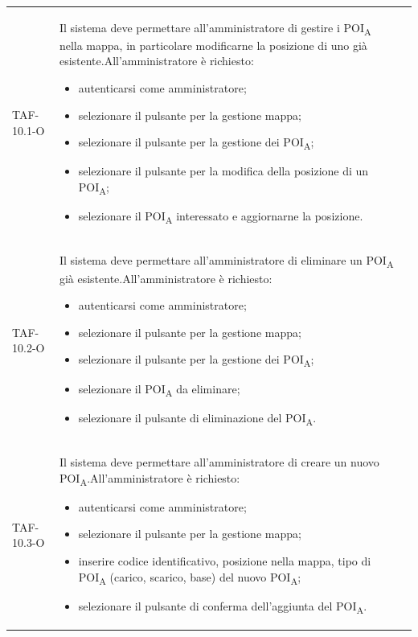 \begin{longtable}{ >{\centering}p{} >{}p{}
		>{\centering}p{}}
	TAF-10.1-O & Il sistema deve permettare all'amministratore di gestire i \acrshort{POI}\textsubscript{A} nella mappa, in particolare modificarne la posizione di uno già esistente.\newline All'amministratore è richiesto: \begin{itemize}\item autenticarsi come amministratore; \item selezionare il pulsante per la gestione mappa; \item selezionare il pulsante per la gestione dei \acrshort{POI}\textsubscript{A}; \item selezionare il pulsante per la modifica della posizione di un \acrshort{POI}\textsubscript{A}; \item selezionare il \acrshort{POI}\textsubscript{A} interessato e aggiornarne la posizione.\end{itemize} & 0\tabularnewline
	
	TAF-10.2-O & Il sistema deve permettare all'amministratore di eliminare un \acrshort{POI}\textsubscript{A} già esistente.\newline All'amministratore è richiesto: \begin{itemize}\item autenticarsi come amministratore; \item selezionare il pulsante per la gestione mappa; \item selezionare il pulsante per la gestione dei \acrshort{POI}\textsubscript{A}; \item selezionare il \acrshort{POI}\textsubscript{A} da eliminare; \item selezionare il pulsante di eliminazione del \acrshort{POI}\textsubscript{A}.\end{itemize} & 0\tabularnewline
	
	TAF-10.3-O & Il sistema deve permettare all'amministratore di creare un nuovo \acrshort{POI}\textsubscript{A}.\newline All'amministratore è richiesto: \begin{itemize}\item autenticarsi come amministratore; \item selezionare il pulsante per la gestione mappa; \item inserire codice identificativo, posizione nella mappa, tipo di \acrshort{POI}\textsubscript{A} (carico, scarico, base) del nuovo \acrshort{POI}\textsubscript{A}; \item selezionare il pulsante di conferma dell'aggiunta del \acrshort{POI}\textsubscript{A}.\end{itemize} & 0\tabularnewline
	

\end{longtable}
